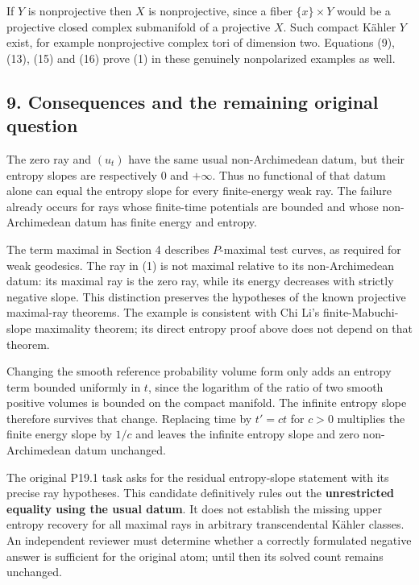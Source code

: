 \documentclass[
]{article}
\begin{document}
If \(Y\) is nonprojective then \(X\) is nonprojective, since a fiber
\(\{x\}\times Y\) would be a projective closed complex submanifold of a
projective \(X\). Such compact Kähler \(Y\) exist, for example
nonprojective complex tori of dimension two. Equations (9), (13), (15)
and (16) prove (1) in these genuinely nonpolarized examples as well.

\subsection{9. Consequences and the remaining original
question}\label{consequences-and-the-remaining-original-question}

The zero ray and \((u_t)\) have the same usual non-Archimedean datum,
but their entropy slopes are respectively \(0\) and \(+\infty\). Thus no
functional of that datum alone can equal the entropy slope for every
finite-energy weak ray. The failure already occurs for rays whose
finite-time potentials are bounded and whose non-Archimedean datum has
finite energy and entropy.

The term maximal in Section 4 describes \(P\)-maximal test curves, as
required for weak geodesics. The ray in (1) is not maximal relative to
its non-Archimedean datum: its maximal ray is the zero ray, while its
energy decreases with strictly negative slope. This distinction
preserves the hypotheses of the known projective maximal-ray theorems.
The example is consistent with Chi Li's finite-Mabuchi-slope maximality
theorem; its direct entropy proof above does not depend on that theorem.

Changing the smooth reference probability volume form only adds an
entropy term bounded uniformly in \(t\), since the logarithm of the
ratio of two smooth positive volumes is bounded on the compact manifold.
The infinite entropy slope therefore survives that change. Replacing
time by \(t' = c t\) for \(c>0\) multiplies the finite energy slope by
\(1/c\) and leaves the infinite entropy slope and zero non-Archimedean
datum unchanged.

The original P19.1 task asks for the residual entropy-slope statement
with its precise ray hypotheses. This candidate definitively rules out
the \textbf{unrestricted equality using the usual datum}. It does not
establish the missing upper entropy recovery for all maximal rays in
arbitrary transcendental Kähler classes. An independent reviewer must
determine whether a correctly formulated negative answer is sufficient
for the original atom; until then its solved count remains unchanged.
\end{document}
